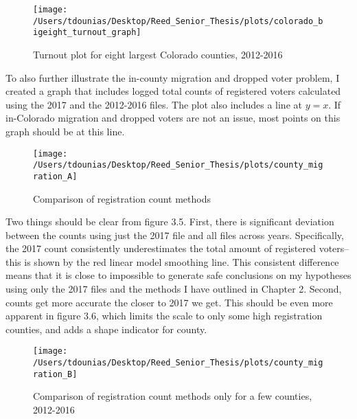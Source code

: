 \documentclass[]{article}
\begin{document}
\begin{figure}

{\centering \texttt{[image: /Users/tdounias/Desktop/Reed\_Senior\_Thesis/plots/colorado\_bigeight\_turnout\_graph]} 

}

\caption{Turnout plot for eight largest Colorado counties, 2012-2016}\label{fig:big eight turnout plot}
\end{figure}

To also further illustrate the in-county migration and dropped voter
problem, I created a graph that includes logged total counts of
registered voters calculated using the 2017 and the 2012-2016 files. The
plot also includes a line at \(y = x\). If in-Colorado migration and
dropped voters are not an issue, most points on this graph should be at
this line.

\begin{figure}

{\centering \texttt{[image: /Users/tdounias/Desktop/Reed\_Senior\_Thesis/plots/county\_migration\_A]} 

}

\caption{Comparison of registration count methods}\label{fig:county migration A}
\end{figure}

Two things should be clear from figure 3.5. First, there is significant
deviation between the counts using just the 2017 file and all files
across years. Specifically, the 2017 count consistently underestimates
the total amount of registered voters--this is shown by the red linear
model smoothing line. This consistent difference means that it is close
to impossible to generate safe conclusions on my hypotheses using only
the 2017 files and the methods I have outlined in Chapter 2. Second,
counts get more accurate the closer to 2017 we get. This should be even
more apparent in figure 3.6, which limits the scale to only some high
registration counties, and adds a shape indicator for county.

\begin{figure}

{\centering \texttt{[image: /Users/tdounias/Desktop/Reed\_Senior\_Thesis/plots/county\_migration\_B]} 

}

\caption{Comparison of registration count methods only for a few counties, 2012-2016}\label{fig:county migration B}
\end{figure}
\end{document}
